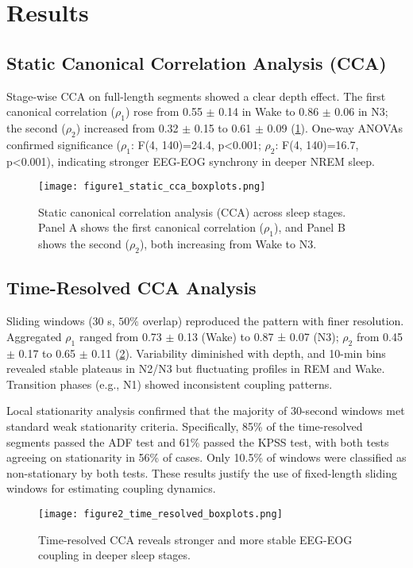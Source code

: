 \section{Results}

\subsection{Static Canonical Correlation Analysis (CCA)}

Stage-wise CCA on full-length segments showed a clear depth effect. The first canonical correlation ($\rho_1$) rose from 0.55 $\pm$ 0.14 in Wake to 0.86 $\pm$ 0.06 in N3; the second ($\rho_2$) increased from 0.32 $\pm$ 0.15 to 0.61 $\pm$ 0.09 (\ref{fig:figure1}). One-way ANOVAs confirmed significance ($\rho_1$: F(4, 140)=24.4, p<0.001; $\rho_2$: F(4, 140)=16.7, p<0.001), indicating stronger EEG-EOG synchrony in deeper NREM sleep.

\begin{figure}
\centering
\texttt{[image: figure1\_static\_cca\_boxplots.png]} %
\caption{Static canonical correlation analysis (CCA) across sleep stages. Panel A shows the first canonical correlation ($\rho_1$), and Panel B shows the second ($\rho_2$), both increasing from Wake to N3.}\label{fig:figure1}
\end{figure}

\subsection{Time-Resolved CCA Analysis}

Sliding windows (30 s, $50\%$ overlap) reproduced the pattern with finer resolution. Aggregated $\rho_1$ ranged from 0.73 $\pm$ 0.13 (Wake) to 0.87 ± 0.07 (N3); $\rho_2$ from 0.45 $\pm$ 0.17 to 0.65 $\pm$ 0.11 (\ref{fig:figure2}). Variability diminished with depth, and 10-min bins revealed stable plateaus in N2/N3 but fluctuating profiles in REM and Wake. Transition phases (e.g., N1) showed inconsistent coupling patterns.

Local stationarity analysis confirmed that the majority of 30-second windows met standard weak stationarity criteria. Specifically, 85\% of the time-resolved segments passed the ADF test and 61\% passed the KPSS test, with both tests agreeing on stationarity in 56\% of cases. Only 10.5\% of windows were classified as non-stationary by both tests. These results justify the use of fixed-length sliding windows for estimating coupling dynamics.
\begin{figure}
\centering
\texttt{[image: figure2\_time\_resolved\_boxplots.png]} %
\caption{Time-resolved CCA reveals stronger and more stable EEG-EOG coupling in deeper sleep stages.}\label{fig:figure2}
\end{figure}

